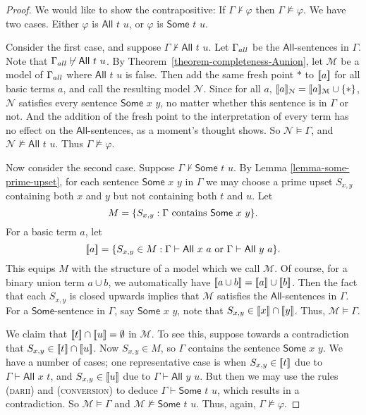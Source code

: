 \documentclass[letterpaper]{article} %
\theoremstyle{definition}
\newcommand{\semantics}[1]{[\![\mbox{\em $ #1 $\/}]\!]}
\newcommand{\Model}{\mathcal{M}}
\newcommand{\Nodel}{\mathcal{N}}
\newcommand{\set}[1]{\{ #1 \}}
\newcommand{\proves}{\vdash}
\newcommand{\proverule}{\textsc}
\newcommand{\conversion}{\proverule{conversion}}
\newcommand{\darii}{\proverule{darii}}
\newcommand{\All}[2]{\mathsf{All}\,\,#1\,\,#2}
\newcommand{\Some}[2]{\mathsf{Some}\,\,#1\,\,#2}
\newcommand{\AllNoArgs}{\mathsf{All}}
\newcommand{\SomeNoArgs}{\mathsf{Some}}
\begin{document}
\begin{proof}

We would like to show the contrapositive:  
If $\Gamma \nvdash \varphi$ then $\Gamma \nvDash \varphi$. 
We have two cases.  Either $\varphi$ is $\All{t}{u}$, or $\varphi$ is $\Some{t}{u}$.

Consider the first case, and suppose $\Gamma \nvdash \All{t}{u}$.
Let $\Gamma_{\scriptsize all}$ be the $\AllNoArgs$-sentences in $\Gamma$.
Note that $\Gamma_{\scriptsize all}\not\proves \All{t}{u}$.
By Theorem~\ref{theorem-completeness-Aunion}, let $\Model$
be a model of $\Gamma_{\scriptsize all}$ where $\All{t}{u}$ is false.
Then add the same fresh point $*$ to $\semantics{a}$ for all basic terms $a$, and call the resulting model $\Nodel$.
Since for all $a$, $\semantics{a}_{\Nodel} = \semantics{a}_{\Model}\cup\set{*}$, $\Nodel$ satisfies every sentence $\Some{x}{y}$,
no matter whether this sentence is in $\Gamma$ or not.
And the addition of the fresh point to the interpretation of every term
has no effect on the $\AllNoArgs$-sentences, as a moment's thought shows.
So $\Nodel\models\Gamma$, and $\Nodel\not\models\All{t}{u}$.  Thus $\Gamma \nvDash \varphi$.

Now consider the second case.  Suppose $\Gamma \nvdash \Some{t}{u}$.  By Lemma \ref{lemma-some-prime-upset}, 
 for each sentence $\Some{x}{y}$ in $\Gamma$ we may
 choose a prime upset $S_{x,y}$ containing both $x$ and $y$
 but not containing both $t$ and $u$.
 Let 
 \[ M = \set{S_{x,y}: \Gamma \mbox{ contains }\protect{\Some{x}{y}}}.\]
 For a basic term $a$, let 
 \[\semantics{a} = \set{S_{x,y}
\in M: \Gamma \vdash \All{x}{a} \mbox{ or } \Gamma \vdash \All{y}{a}}.\]
 This equips $M$ with the structure of a model which we call $\Model$.
 Of course, for a binary union term $a \cup b$, 
 we automatically have $\semantics{a \cup b} = \semantics{a} \cup\semantics{b}$.
 Then the fact that each $S_{x,y}$ is closed upwards implies that $\Model$
satisfies the $\AllNoArgs$-sentences in $\Gamma$.
For a $\SomeNoArgs$-sentence in $\Gamma$, say $\Some{x}{y}$,
note that $S_{x,y}\in \semantics{x}\cap\semantics{y}$.  
Thus, $\Model\models\Gamma$.   

We claim that $\semantics{t}\cap\semantics{u} = \emptyset$
in $\Model$.   To see this, suppose towards a contradiction that 
$S_{x,y} \in\semantics{t}\cap\semantics{u} $.
Now $S_{x,y}\in M$, so $\Gamma$ contains
the sentence $\Some{x}{y}$.
We have a number of cases; one representative case is when
$S_{x,y} \in\semantics{t}$ due to $\Gamma \vdash \All{x}{t}$,
and $S_{x,y} \in\semantics{u}$ due to $\Gamma \vdash \All{y}{u}$.  But then we may use the rules (\darii) and (\conversion) to deduce $\Gamma \proves \Some{t}{u}$, which results in a contradiction.  So $\Model \vDash \Gamma$ and $\Model \nvDash \Some{t}{u}$.  Thus, again, $\Gamma \nvDash \varphi$.
 \end{proof}
\end{document}
